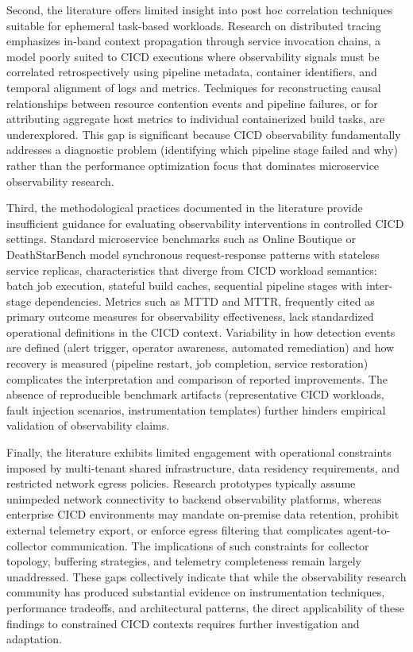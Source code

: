 Second, the literature offers limited insight into post hoc correlation techniques suitable for ephemeral task-based workloads. Research on distributed tracing emphasizes in-band context propagation through service invocation chains, a model poorly suited to \ac{CICD} executions where observability signals must be correlated retrospectively using pipeline metadata, container identifiers, and temporal alignment of logs and metrics. Techniques for reconstructing causal relationships between resource contention events and pipeline failures, or for attributing aggregate host metrics to individual containerized build tasks, are underexplored. This gap is significant because \ac{CICD} observability fundamentally addresses a diagnostic problem (identifying which pipeline stage failed and why) rather than the performance optimization focus that dominates microservice observability research.

Third, the methodological practices documented in the literature provide insufficient guidance for evaluating observability interventions in controlled \ac{CICD} settings. Standard microservice benchmarks such as Online Boutique or DeathStarBench model synchronous request-response patterns with stateless service replicas, characteristics that diverge from \ac{CICD} workload semantics: batch job execution, stateful build caches, sequential pipeline stages with inter-stage dependencies. Metrics such as \gls{MTTD} and \gls{MTTR}, frequently cited as primary outcome measures for observability effectiveness, lack standardized operational definitions in the \ac{CICD} context. Variability in how detection events are defined (alert trigger, operator awareness, automated remediation) and how recovery is measured (pipeline restart, job completion, service restoration) complicates the interpretation and comparison of reported improvements. The absence of reproducible benchmark artifacts (representative \ac{CICD} workloads, fault injection scenarios, instrumentation templates) further hinders empirical validation of observability claims.

Finally, the literature exhibits limited engagement with operational constraints imposed by multi-tenant shared infrastructure, data residency requirements, and restricted network egress policies. Research prototypes typically assume unimpeded network connectivity to backend observability platforms, whereas enterprise \ac{CICD} environments may mandate on-premise data retention, prohibit external telemetry export, or enforce egress filtering that complicates agent-to-collector communication. The implications of such constraints for collector topology, buffering strategies, and telemetry completeness remain largely unaddressed. These gaps collectively indicate that while the observability research community has produced substantial evidence on instrumentation techniques, performance tradeoffs, and architectural patterns, the direct applicability of these findings to constrained \ac{CICD} contexts requires further investigation and adaptation.

